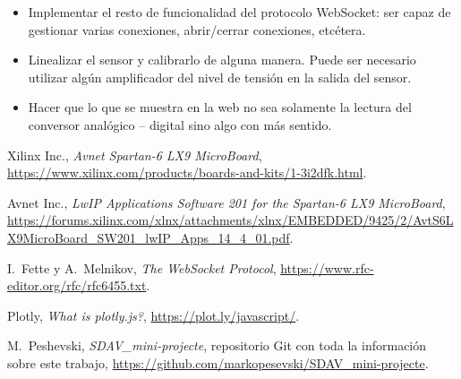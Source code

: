 \documentclass[conference,compsoc]{IEEEtran}
\begin{document}
		\begin{itemize}
			\item
			{

				Implementar el resto de funcionalidad del protocolo WebSocket: ser capaz de
				gestionar varias conexiones, abrir/cerrar conexiones, etc\'etera.

			}
			\item
			{

				Linealizar el sensor y calibrarlo de alguna manera. Puede ser necesario utilizar
				alg\'un amplificador del nivel de tensi\'on en la salida del sensor.

			}
			\item
			{

				Hacer que lo que se muestra en la web no sea solamente la lectura del conversor
				anal\'ogico -- digital sino algo con m\'as sentido.

			}
		\end{itemize}

	
	\begin{thebibliography}{1}

			Xilinx Inc., \emph{Avnet Spartan-6 LX9 MicroBoard}, \url{https://www.xilinx.com/products/boards-and-kits/1-3i2dfk.html}.

			Avnet Inc., \emph{LwIP Applications Software 201 for the Spartan-6 LX9 MicroBoard}, \url{https://forums.xilinx.com/xlnx/attachments/xlnx/EMBEDDED/9425/2/AvtS6LX9MicroBoard_SW201_lwIP_Apps_14_4_01.pdf}.

			I.~Fette y A.~Melnikov, \emph{The WebSocket Protocol}, \url{https://www.rfc-editor.org/rfc/rfc6455.txt}.

			Plotly, \emph{What is plotly.js?}, \url{https://plot.ly/javascript/}.

			M.~Peshevski, \emph{SDAV\_mini-projecte}, repositorio Git con toda la informaci\'on sobre este trabajo, \url{https://github.com/markopesevski/SDAV_mini-projecte}.

	\end{thebibliography}
\end{document}
